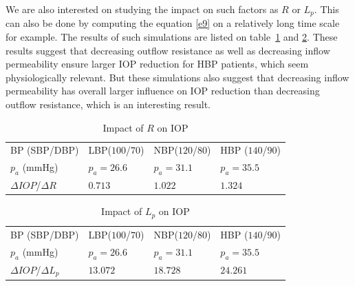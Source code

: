 We are also interested on studying the impact on such factors as $R$ or $L_p$. This can also be done by computing the equation \eqref{e9} on a relatively long time scale for example. The results of such simulations are listed on table~\ref{table:r} and \ref{table:lp}. These results suggest that decreasing outflow resistance as well as decreasing inflow permeability ensure larger IOP reduction for HBP patients, which seem physiologically relevant. But these simulations also suggest that decreasing inflow permeability has overall larger influence on IOP reduction than decreasing outflow resistance, which is an interesting result.
\begin{table}[h]
\begin{tabular}{|l|l|l|l|}
\hline
BP (SBP/DBP)& LBP($100$/$70$)&NBP($120$/$80$) & HBP ($140$/$90$)\\
$p_a$ (mmHg)& $p_a = 26.6$ & $p_a = 31.1$ & $p_a = 35.5$\\
\hline
$\Delta IOP$/$\Delta R $& $0.713$ & $1.022$ & $1.324$\\
\hline
\end{tabular}
\caption{\label{table:r}Impact of $R$ on IOP}
\end{table}
\begin{table}[h]
\begin{tabular}{|l|l|l|l|}
\hline
BP (SBP/DBP)& LBP($100$/$70$)&NBP($120$/$80$) & HBP ($140$/$90$)\\
$p_a$ (mmHg)& $p_a = 26.6$ & $p_a = 31.1$ & $p_a = 35.5$\\
\hline
$\Delta IOP$/$\Delta L_p $& $13.072$ & $18.728$ & $24.261$\\
\hline
\end{tabular}
\caption{\label{table:lp}Impact of $L_p$ on IOP}
\end{table}

